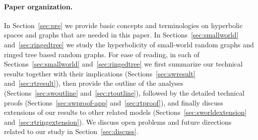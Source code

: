 \documentclass[11pt]{article}
\begin{document}
%
%


\paragraph{Paper organization.}
In Section~\ref{sec:pre} we provide
	basic concepts and terminologies on hyperbolic spaces and graphs
	that are needed in this paper.
In Sections~\ref{sec:smallworld} and~\ref{sec:ringedtree} we study
	the hyperbolicity of small-world random graphs and ringed tree based
	random graphs.
For ease of reading, in each of Sections~\ref{sec:smallworld} and~\ref{sec:ringedtree}
	we first summarize our technical results together
	with their implications (Sections~\ref{sec:swresult} and~\ref{sec:rtresult}), then provide
	the outline of the analyses (Sections~\ref{sec:swoutline} and~\ref{sec:rtoutline}), followed by
	the detailed technical proofs (Sections~\ref{sec:swproof-app} and~\ref{sec:rtproof}), and finally
	discuss extensions of our results
		to other related models (Sections~\ref{sec:sworldextension} and~\ref{sec:rtringextension}).
We discuss open problems and future directions
	related to our study in Section~\ref{sec:discuss}.
\end{document}
